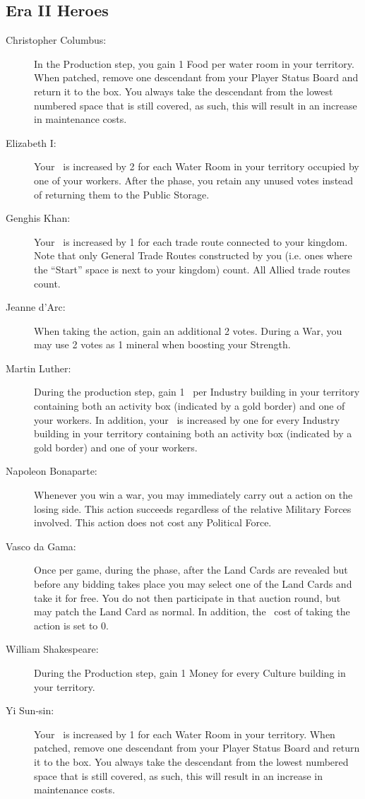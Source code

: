 \documentclass[10pt,twocolumn]{article}
\begin{document}
\begin{appendices}
\subsection{Era II Heroes}
\begin{description}
\item[Christopher Columbus:] In the Production step, you gain 1 Food per water room in your territory. When patched, remove one descendant from your Player Status Board and return it to the box. You always take the descendant from the lowest numbered space that is still covered, as such, this will result in an increase in maintenance costs.
\item[Elizabeth I:] Your \mil\ is increased by 2 for each Water Room in your territory occupied by one of your workers. After the  phase, you retain any unused votes instead of returning them to the Public Storage.
\item[Genghis Khan:] Your \mil\ is increased by 1 for each trade route connected to your kingdom. Note that only General Trade Routes constructed by you (i.e. ones where the ``Start'' space is next to your kingdom) count. All Allied trade routes count.
\item[Jeanne d'Arc:] When taking the  action, gain an additional 2 votes. During a War, you may use 2 votes as 1 mineral when boosting your Strength.
\item[Martin Luther:] During the production step, gain 1 \vp\ per Industry building in your territory containing both an activity box (indicated by a gold border) and one of your workers. In addition, your \mil\ is increased by one for every Industry building in your territory containing both an activity box (indicated by a gold border) and one of your workers.
\item[Napoleon Bonaparte:] Whenever you win a war, you may immediately carry out a  action on the losing side. This action succeeds regardless of the relative Military Forces involved. This action does not cost any Political Force.
\item[Vasco da Gama:] Once per game, during the  phase, after the Land Cards are revealed but before any bidding takes place you may select one of the Land Cards and take it for free. You do not then participate in that auction round, but may patch the Land Card as normal. In addition, the \polf\ cost of taking the  action is set to 0.
\item[William Shakespeare:] During the Production step, gain 1 Money for every Culture building in your territory.
\item[Yi Sun-sin:] Your \mil\ is increased by 1 for each Water Room in your territory. When patched, remove one descendant from your Player Status Board and return it to the box. You always take the descendant from the lowest numbered space that is still covered, as such, this will result in an increase in maintenance costs.
\end{description}

\end{appendices}
\end{document}
